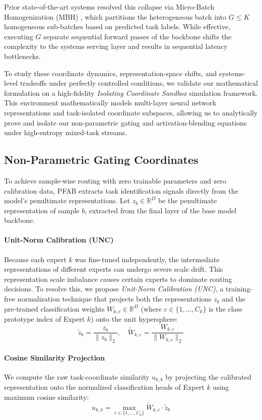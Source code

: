 Prior state-of-the-art systems resolved this collapse via Micro-Batch Homogenization (MBH) \cite{subspace2026}, which partitions the heterogeneous batch into $G \le K$ homogeneous sub-batches based on predicted task labels. While effective, executing $G$ separate sequential forward passes of the backbone shifts the complexity to the systems serving layer and results in sequential latency bottlenecks.

To study these coordinate dynamics, representation-space shifts, and systems-level tradeoffs under perfectly controlled conditions, we validate our mathematical formulation on a high-fidelity \emph{Isolating Coordinate Sandbox} simulation framework. This environment mathematically models multi-layer neural network representations and task-isolated coordinate subspaces, allowing us to analytically prove and isolate our non-parametric gating and activation-blending equations under high-entropy mixed-task streams.

\subsection{Non-Parametric Gating Coordinates}
To achieve sample-wise routing with zero trainable parameters and zero calibration data, \textsc{PFAB} extracts task identification signals directly from the model's penultimate representations. Let $z_b \in \mathbb{R}^D$ be the penultimate representation of sample $b$, extracted from the final layer of the base model backbone.

\paragraph{Unit-Norm Calibration (UNC)}
Because each expert $k$ was fine-tuned independently, the intermediate representations of different experts can undergo severe scale drift. This representation scale imbalance causes certain experts to dominate routing decisions. To resolve this, we propose \emph{Unit-Norm Calibration (UNC)}, a training-free normalization technique that projects both the representations $z_b$ and the pre-trained classification weights $W_{k,c} \in \mathbb{R}^D$ (where $c \in \{1, \dots, C_k\}$ is the class prototype index of Expert $k$) onto the unit hypersphere:
\begin{equation}
  \tilde{z}_b = \frac{z_b}{\|z_b\|_2}, \quad \tilde{W}_{k,c} = \frac{W_{k,c}}{\|W_{k,c}\|_2}
\end{equation}

\paragraph{Cosine Similarity Projection}
We compute the raw task-coordinate similarity $u_{k, b}$ by projecting the calibrated representation onto the normalized classification heads of Expert $k$ using maximum cosine similarity:
\begin{equation}
  u_{k, b} = \max_{c \in \{1, \dots, C_k\}} \tilde{W}_{k, c} \cdot \tilde{z}_b
\end{equation}

